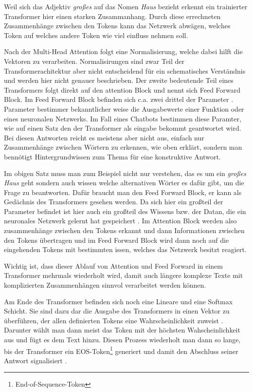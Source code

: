 	\noindent Weil sich das Adjektiv \emph{großes} auf das Nomen \emph{Haus} bezieht erkennt ein trainierter Transformer hier
	einen starken Zusammanhang. Durch diese errechneten Zusammenhänge zwischen den Tokens kann das Netzwerk abwägen, welches
	Token auf welches andere Token wie viel einfluss nehmen soll.	
		
	Nach der Multi-Head Attention folgt eine Normalisierung, welche dabei hilft die Vektoren zu verarbeiten. 
	Normalisirungen sind zwar Teil der Transformerachitektur aber nicht entscheidend für ein schematisches Verständnis
	und werden hier nicht genauer beschrieben\cite[S.3]{vaswani2017}. 
	\clearpage
	\noindent
	Der zweite bedeutende Teil eines Transformers folgt direkt auf den attention Block und nennt sich Feed Forward Block.
	Im Feed Forward Block befinden sich c.a. zwei drittel der Parameter \cite{geva2024}. Parameter bestimmer bekanntlicher weise
	die Ausgabewerte einer Funktion oder eines neuronalen Netzwerks. Im Fall eines Chatbots bestimmen diese Paramter, wie auf 
	einen Satz den der Transformer als eingabe bekommt geantwortet wird. Bei diesen Antworten reicht es meistens aber nicht aus, 
	einfach nur Zusammenhänge zwischen Wörtern zu erkennen, wie oben erklärt, sondern man bennötigt Hintergrundwissen zum Thema 
	für eine konstruktive Antwort.

	Im obigen Satz muss man zum Beispiel nicht nur verstehen, das es um ein \emph{großes Haus} geht sondern auch wissen welche alternativen
	Wörter es dafür gibt, um die Frage zu beantworten. Dafür braucht man den Feed Forward Block, er kann als Gedächnis des Transformers gesehen
	werden. Da sich hier ein großteil der Parameter befindet ist hier auch ein großteil des Wissens bzw. der Datan, die ein neuronales
	Netzwerk gelernt hat gespeichert \cite{geva2024}.
	\vspace{5mm}
	Im Attention Block werden also zusammenhänge zwischen den Tokens erkannt und dann Informationen zwischen den Tokens übertragen
	und im Feed Forward Block wird dann noch auf die eingehenden Tokens mit bestimmten issen, welches das Netzwerk besitzt reagiert.
	
	Wichtig ist, dass dieser Ablauf von Attention und Feed Forward in einem Transformer mehrmals wiederholt wird, damit auch längere komplexe Texte mit
	komplizierten Zusammenhängen sinnvol verarbeitet werden können.
	
	Am Ende des Transformer befinden sich noch eine Lineare und eine Softmax Schicht. Sie sind dazu dar die Ausgabe des Transformers
	in einen Vektor zu überführen, der allen definierten Tokens eine Wahrscheinlichkeit zuweist \cite[S. 70]{nielsen2015}. Darunter wählt man dann meist das Token 
	mit der höchsten Wahscheinlichkeit aus und fügt es dem Text hinzu. Diesen Prozess wiederholt man dann so lange, bis der Transformer
	ein EOS-Token\footnote{End-of-Sequence-Token} generiert und damit den Abschluss seiner Antwort signalisiert \cite[S. 2]{vaswani2017}.
	
